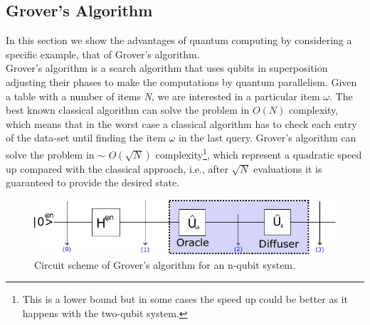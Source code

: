 \subsection{Grover's Algorithm}
In this section we show the advantages of quantum computing by considering a specific example, that of Grover's algorithm.\\
Grover's algorithm is a search algorithm that uses qubits in superposition adjusting their phases to make the computations by quantum parallelism. Given a table with a number of items \textit{N}, we are interested in a particular item $\omega$. The best known classical algorithm can solve the problem in $O(N)$ complexity, which means that in the worst case a classical algorithm has to check each entry of the data-set until finding the item $\omega$ in the last query. Grover's algorithm can solve the problem in $\sim$ $O(\sqrt{N})$ complexity\footnote{This is a lower bound but in some cases the speed up could be better as it happens with the two-qubit system.}, which represent a quadratic speed up compared with the classical approach, i.e., after $\sqrt{N}$ evaluations it is guaranteed to provide the desired state.
\begin{figure}[h]
    \centering
    \includegraphics[width=\textwidth]{Figures/Grover_Circuit.pdf}
    \caption{Circuit scheme of Grover's algorithm for an n-qubit system.}
    \label{fig:Grover_circuit}
\end{figure}
